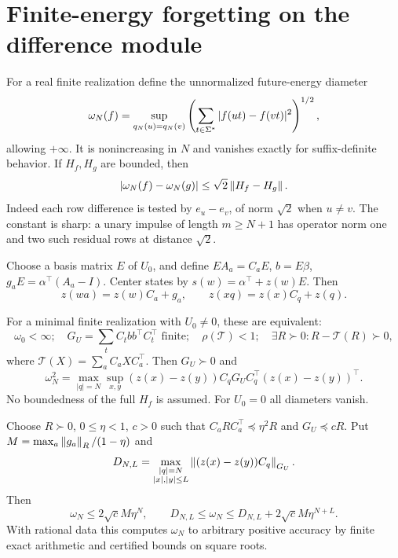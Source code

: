 \section{Finite-energy forgetting on the difference module}\label{III:S:sec:metric}
For a real finite realization define the unnormalized future-energy diameter
\[
 \omega_N(f)=\sup_{q_N(u)=q_N(v)}
       \left(\sum_{t\in\Sigma^*}|f(ut)-f(vt)|^2\right)^{1/2},
\]
allowing $+\infty$. It is nonincreasing in $N$ and vanishes exactly for suffix-definite behavior. If $H_f,H_g$ are bounded, then
\begin{equation}\label{III:S:eq:omegalipschitz}
 |\omega_N(f)-\omega_N(g)|\le\sqrt2\left\lVert H_f-H_g\right\rVert.
\end{equation}
Indeed each row difference is tested by $e_u-e_v$, of norm $\sqrt2$ when $u\ne v$. The constant is sharp: a unary impulse of length $m\ge N+1$ has operator norm one and two such residual rows at distance $\sqrt2$.

Choose a basis matrix $E$ of $U_0$, and define $EA_a=C_aE$, $b=E\beta$, $g_aE=\alpha^\top(A_a-I)$. Center states by $s(w)=\alpha^\top+z(w)E$. Then
\[
 z(wa)=z(w)C_a+g_a,\qquad z(xq)=z(x)C_q+z(q).
\]
\begin{theorem}\label{III:S:thm:diffstable}
For a minimal finite realization with $U_0\ne0$, these are equivalent:
\[
 \omega_0<\infty;\quad
 G_U=\sum_tC_tbb^\top C_t^\top\text{ finite};\quad
 \rho(\mathcal T)<1;\quad
 \exists R\succ0:R-\mathcal T(R)\succ0,
\]
where $\mathcal T(X)=\sum_aC_aXC_a^\top$. Then $G_U\succ0$ and
\[
 \omega_N^2=\max_{|q|=N}\sup_{x,y}
 (z(x)-z(y))C_qG_UC_q^\top(z(x)-z(y))^\top.
\]
No boundedness of the full $H_f$ is assumed. For $U_0=0$ all diameters vanish.
\end{theorem}


\begin{theorem}\label{III:S:thm:finiteomega}
Choose $R\succ0$, $0\le\eta<1$, $c>0$ such that $C_aRC_a^\top\preceq\eta^2R$ and $G_U\preceq cR$. Put $M=\max_a\left\lVert g_a\right\rVert_R/(1-\eta)$ and
\[
 D_{N,L}=\max_{\substack{|q|=N\\|x|,|y|\le L}}
             \left\lVert(z(x)-z(y))C_q\right\rVert_{G_U}.
\]
Then
\[
 \omega_N\le2\sqrt c M\eta^N,\qquad
 D_{N,L}\le\omega_N\le D_{N,L}+2\sqrt c M\eta^{N+L}.
\]
With rational data this computes $\omega_N$ to arbitrary positive accuracy by finite exact arithmetic and certified bounds on square roots.
\end{theorem}


